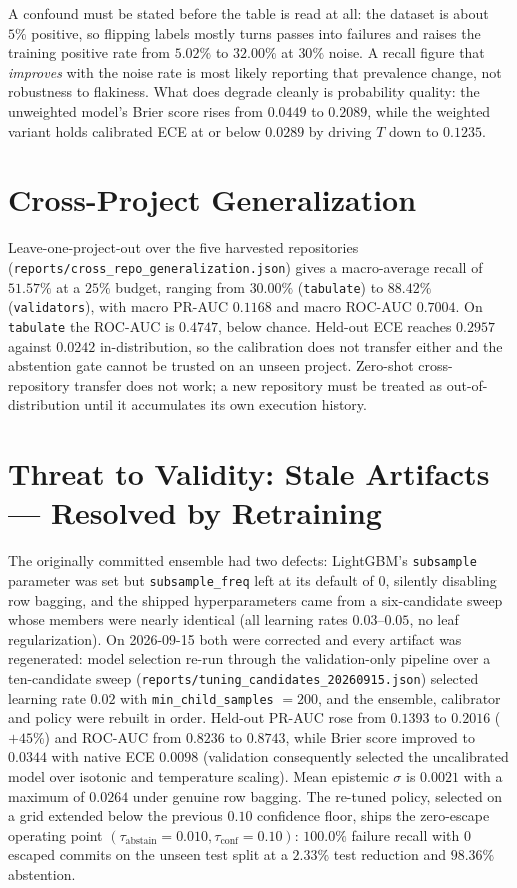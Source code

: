 A confound must be stated before the table is read at all: the dataset is about $5\%$ positive, so
flipping labels mostly turns passes into failures and raises the training positive rate from $5.02\%$ to
$32.00\%$ at $30\%$ noise. A recall figure that \emph{improves} with the noise rate is most likely
reporting that prevalence change, not robustness to flakiness. What does degrade cleanly is probability
quality: the unweighted model's Brier score rises from $0.0449$ to $0.2089$, while the weighted variant
holds calibrated ECE at or below $0.0289$ by driving $T$ down to $0.1235$.

\section{Cross-Project Generalization}
Leave-one-project-out over the five harvested repositories
(\texttt{reports/cross\_repo\_generalization.json}) gives a macro-average recall of $51.57\%$ at a $25\%$
budget, ranging from $30.00\%$ (\texttt{tabulate}) to $88.42\%$ (\texttt{validators}), with macro PR-AUC
$0.1168$ and macro ROC-AUC $0.7004$. On \texttt{tabulate} the ROC-AUC is $0.4747$, below chance.
Held-out ECE reaches $0.2957$ against $0.0242$ in-distribution, so the calibration does not transfer
either and the abstention gate cannot be trusted on an unseen project. Zero-shot cross-repository
transfer does not work; a new repository must be treated as out-of-distribution until it accumulates its
own execution history.

\section{Threat to Validity: Stale Artifacts --- Resolved by Retraining}
The originally committed ensemble had two defects: LightGBM's \texttt{subsample} parameter was set but
\texttt{subsample\_freq} left at its default of $0$, silently disabling row bagging, and the shipped
hyperparameters came from a six-candidate sweep whose members were nearly identical (all learning rates
$0.03$--$0.05$, no leaf regularization). On 2026-09-15 both were corrected and every artifact was
regenerated: model selection re-run through the validation-only pipeline over a ten-candidate sweep
(\texttt{reports/tuning\_candidates\_20260915.json}) selected learning rate $0.02$ with
\texttt{min\_child\_samples} $= 200$, and the ensemble, calibrator and policy were rebuilt in order.
Held-out PR-AUC rose from $0.1393$ to $\mathbf{0.2016}$ ($+45\%$) and ROC-AUC from $0.8236$ to
$0.8743$, while Brier score improved to $0.0344$ with native ECE $0.0098$ (validation consequently
selected the uncalibrated model over isotonic and temperature scaling). Mean epistemic $\sigma$ is
$0.0021$ with a maximum of $0.0264$ under genuine row bagging. The re-tuned policy, selected on a grid
extended below the previous $0.10$ confidence floor, ships the zero-escape operating point
$(\tau_{\text{abstain}} = 0.010, \tau_{\text{conf}} = 0.10)$: $100.0\%$ failure recall with $0$ escaped
commits on the unseen test split at a $2.33\%$ test reduction and $98.36\%$ abstention.

